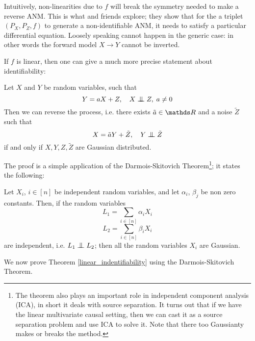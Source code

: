 Intuitively, non-linearities due to $f$ will break the symmetry needed to make a reverse ANM. This is what
\cite{hoyer2009nonlinear} and friends explore; they show that for the 
a triplet $(P_X, P_Z, f)$ to generate a non-identifiable ANM, it needs to satisfy a particular 
differential equation. Loosely speaking cannot happen in the generic case: in other words the forward 
model $X \rightarrow Y$ cannot be inverted. 

If $f$ is linear, then one can give a much more precise statement about identifiability:

\begin{theorem} Let $X$ and $Y$ be random variables, such that
$$
    Y = aX + Z, \quad X \bigCI Z, \; a \neq 0
$$
Then we can reverse the process, i.e. there exists $\tilde{a} \in \R$ and a noise $\tilde{Z}$ such that
$$
    X = \tilde{a}Y + \tilde{Z}, \quad Y \bigCI \tilde{Z}
$$
if and only if $X, Y, Z, \tilde{Z}$ are Gaussian distributed. 
\label{linear_indentifiability}
\end{theorem}

The proof is a simple application of the Darmois-Skitovich Theorem\footnote{ The theorem also plays an important role
in independent component analysis (ICA), in short it deals with source separation. It turns out that if we have the 
linear multivariate causal setting, then we can cast it as a source separation problem and use ICA to solve it. 
Note that there too Gaussianty makes or breaks the method.}; it states the following:

\begin{theorem} Let $X_i$, $i \in [n]$ be independent random variables, and let
    $\alpha_i$, $\beta_j$ be non zero constants. Then, if the random variables
    $$ 
        L_1 = \sum_{i \in [n]} \alpha_i X_i
    $$
    $$ 
        L_2 = \sum_{i \in [n]} \beta_i X_i
    $$
    are independent, i.e. $L_1 \bigCI L_2$; then all the random variables $X_i$ are Gaussian. 
\end{theorem}

We now prove Theorem \ref{linear_indentifiability} using the Darmois-Skitovich Theorem.

